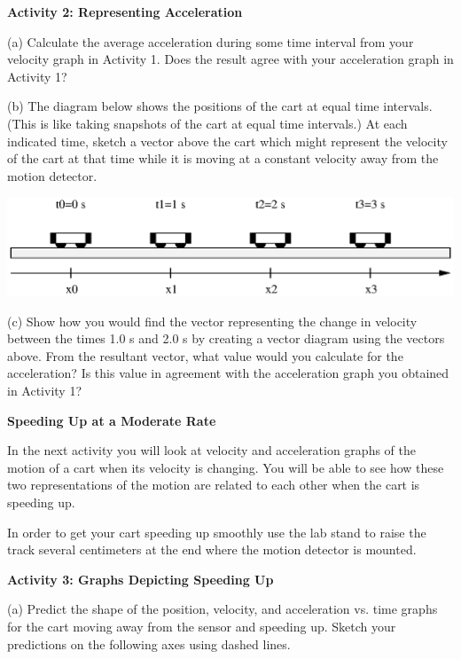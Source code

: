 \textbf{Activity 2: Representing Acceleration} 

(a) Calculate the average acceleration during some time interval from your velocity graph in Activity 1.  Does the result agree with your acceleration graph in Activity 1?
\vspace{20mm}

(b) The diagram below shows the positions of the cart at equal time intervals.
(This is like taking snapshots of the cart at equal time intervals.) At each
indicated time, sketch a vector above the cart which might represent the velocity
of the cart at that time while it is moving at a constant velocity away from
the motion detector.

\vspace{0.3cm}
{\par\centering \includegraphics{changing_fig3.eps} \par}
\vspace{0.3cm}

(c) Show how you would find the vector representing the change in velocity
between the times 1.0 s and 2.0 s by creating a vector diagram using the 
vectors above. From the resultant vector, what
value would you calculate for the acceleration? Is this value in agreement
with the acceleration graph you obtained in Activity 1?
\vspace{20mm}

\textbf{Speeding Up at a Moderate Rate} 

In the next activity you will look at velocity and acceleration graphs of the
motion of a cart when its velocity is changing. You will be able to see how
these two representations of the motion are related to each other when the cart
is speeding up.

In order to get your cart speeding up smoothly use the lab stand to raise the
track several centimeters at the end where the motion detector is mounted.

\textbf{Activity 3: Graphs Depicting Speeding Up} 

(a) Predict the shape of the position, velocity, and acceleration vs. time graphs
for the cart moving away from the sensor and speeding up. Sketch your predictions
on the following axes using dashed lines.

